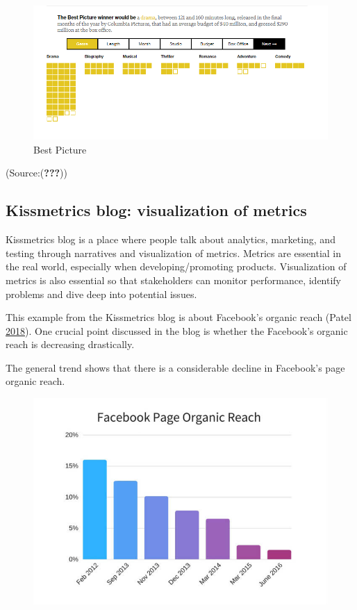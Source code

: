 \documentclass[]{book}
\theoremstyle{definition}
\theoremstyle{definition}
\theoremstyle{definition}
\theoremstyle{remark}
\begin{document}
\begin{figure}
\centering
\includegraphics{images/img_oscars_pic.PNG}
\caption{Best Picture}
\end{figure}

(Source:({\textbf{???}}))

\subsection{Kissmetrics blog: visualization of
metrics}\label{kissmetrics-blog-visualization-of-metrics}

Kissmetrics blog is a place where people talk about analytics,
marketing, and testing through narratives and visualization of metrics.
Metrics are essential in the real world, especially when
developing/promoting products. Visualization of metrics is also
essential so that stakeholders can monitor performance, identify
problems and dive deep into potential issues.

This example from the Kissmetrics blog is about Facebook's organic reach
(Patel \protect\hyperlink{ref-facebook_organic}{2018}). One crucial
point discussed in the blog is whether the Facebook's organic reach is
decreasing drastically.

The general trend shows that there is a considerable decline in
Facebook's page organic reach.

\begin{figure}
\centering
\includegraphics{images/facebook-page-organic-reach-decline-over-years.jpg}
\caption{}
\end{figure}
\end{document}
